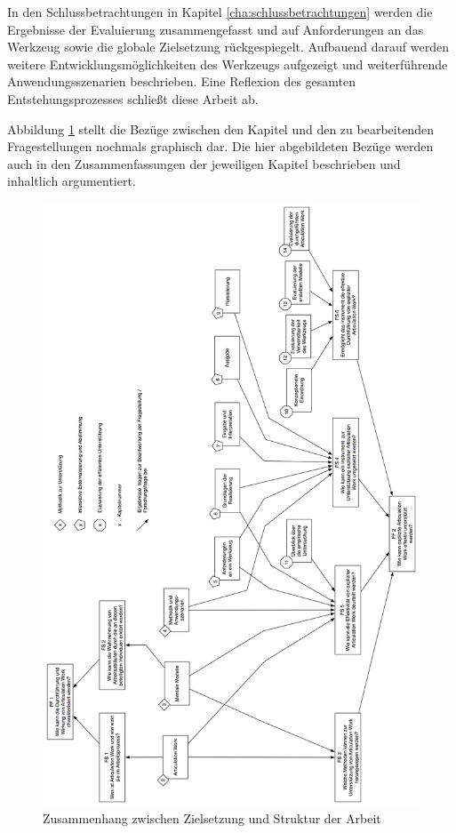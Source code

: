 In den Schlussbetrachtungen in Kapitel \ref{cha:schlussbetrachtungen} werden die Ergebnisse der Evaluierung zusammengefasst und auf Anforderungen an das Werkzeug sowie die globale Zielsetzung rückgespiegelt. Aufbauend darauf werden weitere Entwicklungsmöglichkeiten des Werkzeugs aufgezeigt und weiterführende Anwendungsszenarien beschrieben. Eine Reflexion des gesamten Entstehungsprozesses schließt diese Arbeit ab.

Abbildung \ref{fig:img_Einfuehrung_zusammenhang} stellt die Bezüge zwischen den Kapitel und den zu bearbeitenden Fragestellungen nochmals graphisch dar. Die hier abgebildeten Bezüge werden auch in den Zusammenfassungen der jeweiligen Kapitel beschrieben und inhaltlich argumentiert.

\begin{figure}[htbp]
	\centering
		\includegraphics[height=.9\textheight]{img/Einfuehrung/zusammenhang.png}
	\caption{Zusammenhang zwischen Zielsetzung und Struktur der Arbeit }
	\label{fig:img_Einfuehrung_zusammenhang}
\end{figure}



